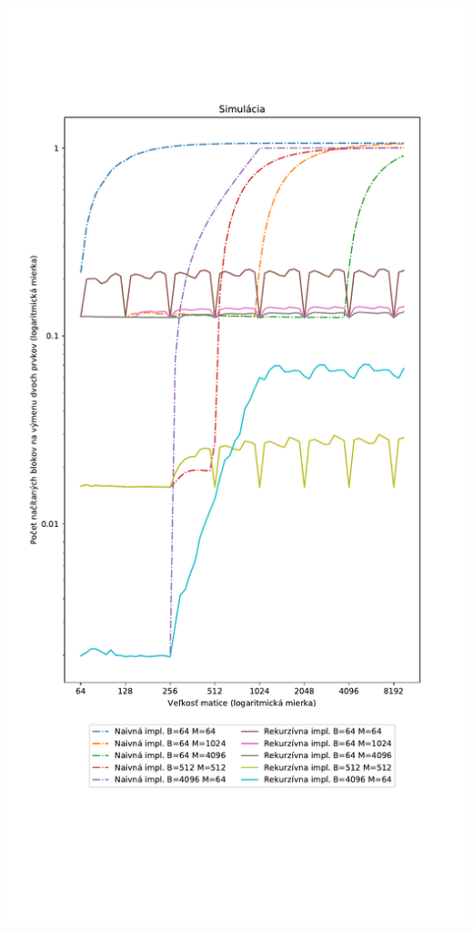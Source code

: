 \documentclass[12pt,a4paper]{article}
\begin{document}
\includegraphics[width=\linewidth]{sim.pdf}
\end{document}
